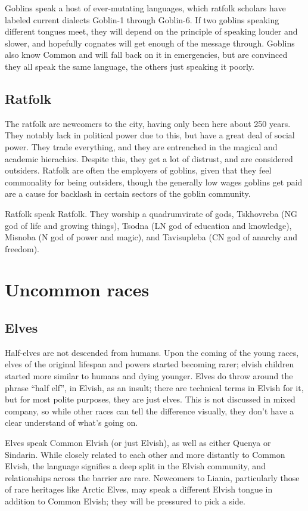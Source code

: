 \documentclass{report}
\begin{document}
Goblins speak a host of ever-mutating languages, which ratfolk scholars have
labeled current dialects Goblin-1 through Goblin-6. If two goblins speaking
different tongues meet, they will depend on the principle of speaking louder and
slower, and hopefully cognates will get enough of the message through. Goblins
also know Common and will fall back on it in emergencies, but are convinced
they all speak the same language, the others just speaking it poorly.

\subsection{Ratfolk}

The ratfolk are newcomers to the city, having only been here about 250 years.
They notably lack in political power due to this, but have a great deal of social
power. They trade everything, and they are entrenched in the magical and academic
hierachies. Despite this, they get a lot of distrust, and are considered outsiders.
Ratfolk are often the employers of goblins, given that they feel commonality for
being outsiders, though the generally low wages goblins get paid are a cause for
backlash in certain sectors of the goblin community.

Ratfolk speak Ratfolk. They worship a quadrumvirate of gods, Tskhovreba (NG
god of life and growing things), Tsodna (LN god of education and knowledge),
Misnoba (N god of power and magic), and Tavisupleba (CN god of anarchy and
freedom).

\section {Uncommon races}

\subsection{Elves}

Half-elves are not descended from humans. Upon the coming of the young races,
elves of the original lifespan and powers started becoming rarer; elvish
children started more similar to humans and dying younger. Elves do throw around
the phrase ``half elf'', in Elvish, as an insult; there are technical terms in Elvish for it,
but for most polite purposes, they are just elves. This is not
discussed in mixed company, so while other races can tell the difference
visually, they don't have a clear understand of what's going on.

Elves speak Common Elvish (or just Elvish), as well as either Quenya or Sindarin.
While closely related to each other and more distantly to Common Elvish, the
language signifies a deep split in the Elvish community, and relationships
across the barrier are rare. Newcomers to Liania, particularly those of rare
heritages like Arctic Elves, may speak a different Elvish
tongue in addition to Common Elvish; they will be pressured to pick a side.
\end{document}
